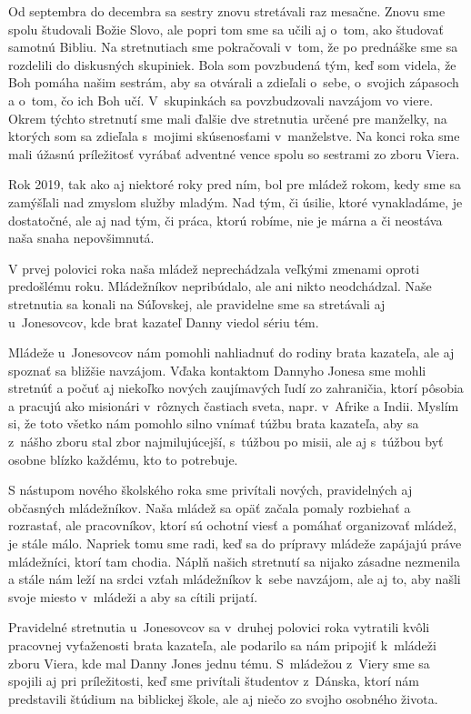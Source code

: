 Od septembra do decembra sa sestry znovu stretávali raz mesačne. Znovu sme spolu študovali Božie Slovo, ale popri tom sme sa učili aj o~tom, ako študovať samotnú Bibliu. Na stretnutiach sme pokračovali v~tom, že po prednáške sme sa rozdelili do diskusných skupiniek. Bola som povzbudená tým, keď som videla, že Boh pomáha našim sestrám, aby sa otvárali a zdieľali o~sebe, o~svojich zápasoch a o~tom, čo ich Boh učí. V~skupinkách sa povzbudzovali navzájom vo viere. Okrem týchto stretnutí sme mali ďalšie dve stretnutia určené pre manželky, na ktorých som sa zdieľala s~mojimi skúsenosťami v~manželstve. Na konci roka sme mali úžasnú príležitosť vyrábať adventné vence spolu so sestrami zo zboru Viera.



Rok 2019, tak ako aj niektoré roky pred ním, bol pre mládež rokom, kedy sme sa zamýšľali nad zmyslom služby mladým. Nad tým, či úsilie, ktoré vynakladáme, je dostatočné, ale aj nad tým, či práca, ktorú robíme, nie je márna a či neostáva naša snaha nepovšimnutá.

V prvej polovici roka naša mládež neprechádzala veľkými zmenami oproti predošlému roku. Mládežníkov nepribúdalo, ale ani nikto neodchádzal. Naše stretnutia sa konali na Súľovskej, ale pravidelne sme sa stretávali aj u~Jonesovcov, kde brat kazateľ Danny viedol sériu tém.

Mládeže u~Jonesovcov nám pomohli nahliadnuť do rodiny brata kazateľa, ale aj spoznať sa bližšie navzájom. Vďaka kontaktom Dannyho Jonesa sme mohli stretnúť a počuť aj niekoľko nových zaujímavých ľudí zo zahraničia, ktorí pôsobia a pracujú ako misionári v~rôznych častiach sveta, napr. v~Afrike a Indii. Myslím si, že toto všetko nám pomohlo silno vnímať túžbu brata kazateľa, aby sa z~nášho zboru stal zbor najmilujúcejší, s~túžbou po misii, ale aj s~túžbou byť osobne blízko každému, kto to potrebuje.

S nástupom nového školského roka sme privítali nových, pravidelných aj občasných mládežníkov. Naša mládež sa opäť začala pomaly rozbiehať a rozrastať, ale pracovníkov, ktorí sú ochotní viesť a pomáhať organizovať mládež, je stále málo. Napriek tomu sme radi, keď sa do prípravy mládeže zapájajú práve mládežníci, ktorí tam chodia. Náplň našich stretnutí sa nijako zásadne nezmenila a stále nám leží na srdci vzťah mládežníkov k~sebe navzájom, ale aj to, aby našli svoje miesto v~mládeži a aby sa cítili prijatí.

Pravidelné stretnutia u~Jonesovcov sa v~druhej polovici roka vytratili kvôli pracovnej vyťaženosti brata kazateľa, ale podarilo sa nám pripojiť k~mládeži zboru Viera, kde mal Danny Jones jednu tému. S~mládežou z~Viery sme sa spojili aj pri príležitosti, keď sme privítali študentov z~Dánska, ktorí nám predstavili štúdium na biblickej škole, ale aj niečo zo svojho osobného života.


